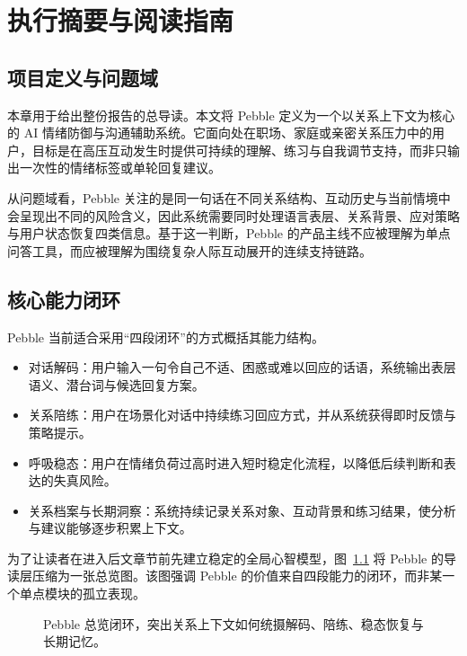 \chapter{执行摘要与阅读指南}

\section{项目定义与问题域}

本章用于给出整份报告的总导读。本文将 Pebble 定义为一个以关系上下文为核心的 AI 情绪防御与沟通辅助系统。它面向处在职场、家庭或亲密关系压力中的用户，目标是在高压互动发生时提供可持续的理解、练习与自我调节支持，而非只输出一次性的情绪标签或单轮回复建议。

从问题域看，Pebble 关注的是同一句话在不同关系结构、互动历史与当前情境中会呈现出不同的风险含义，因此系统需要同时处理语言表层、关系背景、应对策略与用户状态恢复四类信息。基于这一判断，Pebble 的产品主线不应被理解为单点问答工具，而应被理解为围绕复杂人际互动展开的连续支持链路。

\section{核心能力闭环}

Pebble 当前适合采用“四段闭环”的方式概括其能力结构。

\begin{itemize}
  \item 对话解码：用户输入一句令自己不适、困惑或难以回应的话语，系统输出表层语义、潜台词与候选回复方案。
  \item 关系陪练：用户在场景化对话中持续练习回应方式，并从系统获得即时反馈与策略提示。
  \item 呼吸稳态：用户在情绪负荷过高时进入短时稳定化流程，以降低后续判断和表达的失真风险。
  \item 关系档案与长期洞察：系统持续记录关系对象、互动背景和练习结果，使分析与建议能够逐步积累上下文。
\end{itemize}

为了让读者在进入后文章节前先建立稳定的全局心智模型，图~\ref{fig:pebble-overview-loop} 将 Pebble 的导读层压缩为一张总览图。该图强调 Pebble 的价值来自四段能力的闭环，而非某一个单点模块的孤立表现。

\begin{figure}[H]
  \centering
  
  \caption{Pebble 总览闭环，突出关系上下文如何统摄解码、陪练、稳态恢复与长期记忆。}
  \label{fig:pebble-overview-loop}
\end{figure}

